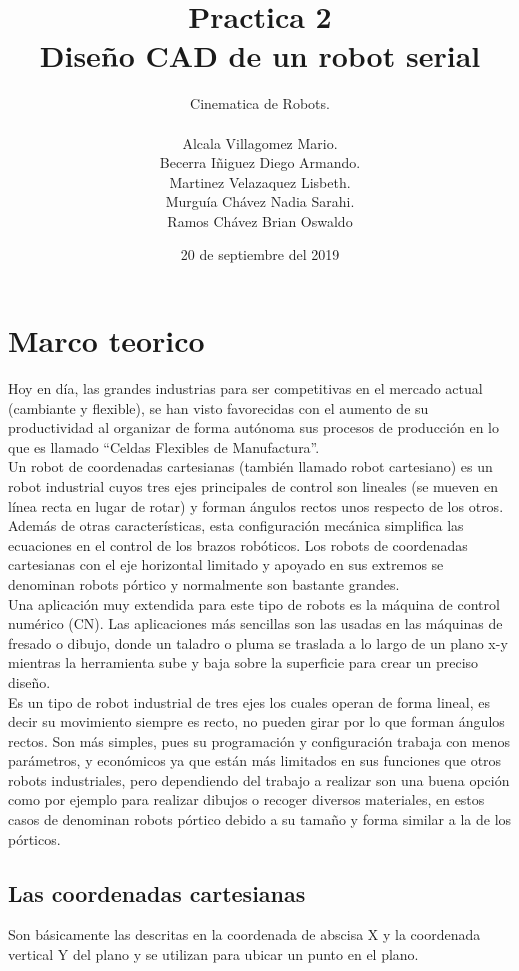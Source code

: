 \documentclass[12pt,a4paper]{report}
\author{Cinematica de Robots.\\\\
		Alcala Villagomez Mario.\\
		Becerra I\~niguez Diego Armando.\\
		Martinez Velazaquez Lisbeth.\\
		Murgu\'ia Ch\'avez Nadia Sarahi.\\
		Ramos Ch\'avez Brian Oswaldo\\}
\title{Practica 2 \\Diseño CAD de un robot serial}
\date{20 de septiembre del 2019}
\begin{document}
\maketitle
\section{Marco teorico}

Hoy en día, las grandes industrias para ser competitivas en el mercado actual (cambiante y flexible), se han visto favorecidas con el aumento de su productividad al organizar de forma autónoma sus procesos de producción en lo que es llamado “Celdas Flexibles de Manufactura”.\\

Un robot de coordenadas cartesianas (también llamado robot cartesiano) es un robot industrial cuyos tres ejes principales de control son lineales (se mueven en línea recta en lugar de rotar) y forman ángulos rectos unos respecto de los otros. Además de otras características, esta configuración mecánica simplifica las ecuaciones en el control de los brazos robóticos. Los robots de coordenadas cartesianas con el eje horizontal limitado y apoyado en sus extremos se denominan robots pórtico y normalmente son bastante grandes.\\

Una aplicación muy extendida para este tipo de robots es la máquina de control numérico (CN). Las aplicaciones más sencillas son las usadas en las máquinas de fresado o dibujo, donde un taladro o pluma se traslada a lo largo de un plano x-y mientras la herramienta sube y baja sobre la superficie para crear un preciso diseño.\\

Es un tipo de robot industrial de tres ejes los cuales operan de forma lineal, es decir su movimiento siempre es recto, no pueden girar por lo que forman ángulos rectos. Son más simples, pues su programación y configuración trabaja con menos parámetros, y económicos ya que están más limitados en sus funciones que otros robots industriales, pero dependiendo del trabajo a realizar son una buena opción como por ejemplo para realizar dibujos o recoger diversos materiales, en estos casos de denominan robots pórtico debido a su tamaño y forma similar a la de los pórticos.

\subsection{Las coordenadas cartesianas}
Son básicamente las descritas en la coordenada de abscisa X y la coordenada vertical Y del plano y se utilizan para ubicar un punto en el plano.
\end{document}
